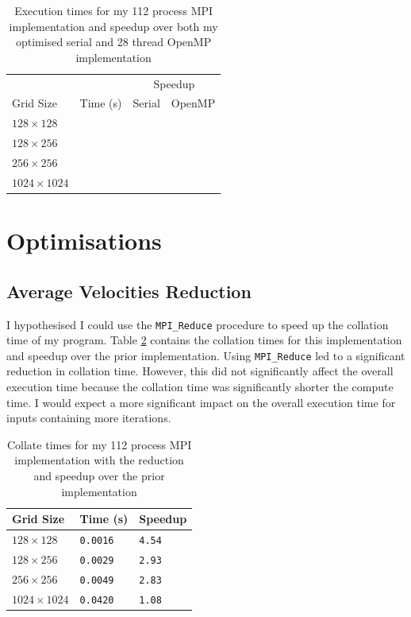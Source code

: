 \documentclass[twocolumn, a4paper]{article}
\begin{document}
\begin{table}[htbp]
  \begin{center}
  \caption{Execution times for my 112 process MPI implementation and speedup over both my optimised serial and 28 thread OpenMP implementation}\label{tab:mpi}
  \begin{tabular}[t]{l | l  l  l} 
      \hline\hline
      &&\multicolumn{2}{c}{Speedup}\\
      \cline{3-4}
      Grid Size&Time (s)&Serial&OpenMP\\
      \hline
      $128 \times 128$&\texttt{}&\texttt{}&\texttt{}\\
      $128 \times 256$&\texttt{}&\texttt{}&\texttt{}\\
      $256 \times 256$&\texttt{}&\texttt{}&\texttt{}\\
      $1024 \times 1024$&\texttt{}&\texttt{}&\texttt{}\\
      \hline
    \end{tabular}
  \end{center}
  \vspace{-1em}
\end{table}

\section{Optimisations}

\subsection{Average Velocities Reduction}

I hypothesised I could use the \texttt{MPI\_Reduce} procedure to speed up the collation time of my program.
Table \ref{tab:reduction} contains the collation times for this implementation and speedup over the prior implementation.
Using \texttt{MPI\_Reduce} led to a significant reduction in collation time.
However, this did not significantly affect the overall execution time because the collation time was significantly shorter the compute time.
I would expect a more significant impact on the overall execution time for inputs containing more iterations.

\begin{table}[htbp]
  \begin{center}
  \caption{Collate times for my 112 process MPI implementation with the reduction and speedup over the prior implementation}\label{tab:reduction}
  \begin{tabular}[t]{l | l l} 
      \hline\hline
      Grid Size&Time (s)&Speedup\\
      \hline
      $128 \times 128$&\texttt{0.0016}&\texttt{4.54}\\
      $128 \times 256$&\texttt{0.0029}&\texttt{2.93}\\
      $256 \times 256$&\texttt{0.0049}&\texttt{2.83}\\
      $1024 \times 1024$&\texttt{0.0420}&\texttt{1.08}\\
      \hline
    \end{tabular}
  \end{center}
  \vspace{-1em}
\end{table}
\end{document}
